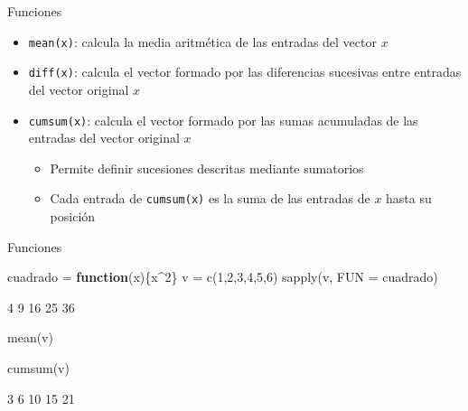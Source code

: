 \documentclass[
  ignorenonframetext,
  aspectratio=169]{beamer}
\newenvironment{Shaded}{\begin{snugshade}}{\end{snugshade}}
\newcommand{\AttributeTok}[1]{\textcolor[rgb]{0.77,0.63,0.00}{#1}}
\newcommand{\ControlFlowTok}[1]{\textcolor[rgb]{0.13,0.29,0.53}{\textbf{#1}}}
\newcommand{\DecValTok}[1]{\textcolor[rgb]{0.00,0.00,0.81}{#1}}
\newcommand{\FunctionTok}[1]{\textcolor[rgb]{0.00,0.00,0.00}{#1}}
\newcommand{\NormalTok}[1]{#1}
\newcommand{\OtherTok}[1]{\textcolor[rgb]{0.56,0.35,0.01}{#1}}
\newcommand{\SpecialCharTok}[1]{\textcolor[rgb]{0.00,0.00,0.00}{#1}}
\providecommand{\tightlist}{%
  \setlength{\itemsep}{0pt}\setlength{\parskip}{0pt}}
\let\oldverbatim\verbatim
\let\endoldverbatim\endverbatim
\renewenvironment{verbatim}{\tiny\oldverbatim}{\endoldverbatim}
\begin{document}
\begin{frame}[fragile]{Funciones}
\protect\hypertarget{funciones-2}{}
\begin{itemize}
\tightlist
\item
  \texttt{mean(x)}: calcula la media aritmética de las entradas del
  vector \(x\)
\item
  \texttt{diff(x)}: calcula el vector formado por las diferencias
  sucesivas entre entradas del vector original \(x\)
\item
  \texttt{cumsum(x)}: calcula el vector formado por las sumas acumuladas
  de las entradas del vector original \(x\)

  \begin{itemize}
  \tightlist
  \item
    Permite definir sucesiones descritas mediante sumatorios
  \item
    Cada entrada de \texttt{cumsum(x)} es la suma de las entradas de
    \(x\) hasta su posición
  \end{itemize}
\end{itemize}
\end{frame}

\begin{frame}[fragile]{Funciones}
\protect\hypertarget{funciones-3}{}
\begin{Shaded}
\begin{Highlighting}[]
\NormalTok{cuadrado }\OtherTok{=} \ControlFlowTok{function}\NormalTok{(x)\{x}\SpecialCharTok{\^{}}\DecValTok{2}\NormalTok{\}}
\NormalTok{v }\OtherTok{=} \FunctionTok{c}\NormalTok{(}\DecValTok{1}\NormalTok{,}\DecValTok{2}\NormalTok{,}\DecValTok{3}\NormalTok{,}\DecValTok{4}\NormalTok{,}\DecValTok{5}\NormalTok{,}\DecValTok{6}\NormalTok{)}
\FunctionTok{sapply}\NormalTok{(v, }\AttributeTok{FUN =}\NormalTok{ cuadrado)}
\end{Highlighting}
\end{Shaded}

\begin{verbatim}
[1]  1  4  9 16 25 36
\end{verbatim}

\begin{Shaded}
\begin{Highlighting}[]
\FunctionTok{mean}\NormalTok{(v)}
\end{Highlighting}
\end{Shaded}

\begin{verbatim}
[1] 3.5
\end{verbatim}

\begin{Shaded}
\begin{Highlighting}[]
\FunctionTok{cumsum}\NormalTok{(v)}
\end{Highlighting}
\end{Shaded}

\begin{verbatim}
[1]  1  3  6 10 15 21
\end{verbatim}
\end{frame}
\end{document}
